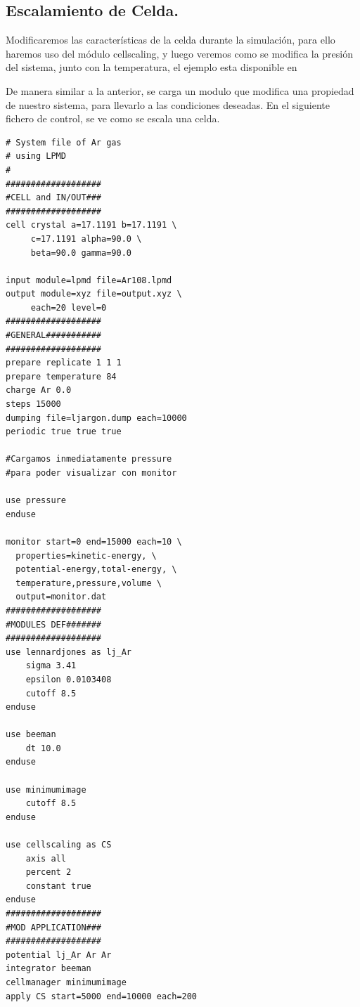 \subsection{Escalamiento de Celda.}

Modificaremos las caracter\'isticas de la celda durante la simulaci\'on, para ello haremos uso del m\'odulo cellscaling, y luego veremos como se modifica la presi\'on del sistema, junto con la temperatura, el ejemplo esta disponible en


De manera similar a la anterior, se carga un modulo que modifica una propiedad de nuestro sistema, para llevarlo a las condiciones deseadas. En el siguiente fichero de control, se ve como se escala una celda.

\begin{multicols}{2}
\setlength{\columnseprule}{.5pt}
\begin{verbatim}
# System file of Ar gas 
# using LPMD
#
###################
#CELL and IN/OUT###
###################
cell crystal a=17.1191 b=17.1191 \
     c=17.1191 alpha=90.0 \
     beta=90.0 gamma=90.0

input module=lpmd file=Ar108.lpmd
output module=xyz file=output.xyz \
     each=20 level=0
###################
#GENERAL###########
###################
prepare replicate 1 1 1
prepare temperature 84
charge Ar 0.0
steps 15000
dumping file=ljargon.dump each=10000
periodic true true true

#Cargamos inmediatamente pressure
#para poder visualizar con monitor

use pressure
enduse

monitor start=0 end=15000 each=10 \
  properties=kinetic-energy, \
  potential-energy,total-energy, \
  temperature,pressure,volume \
  output=monitor.dat
###################
#MODULES DEF#######
###################
use lennardjones as lj_Ar
    sigma 3.41
    epsilon 0.0103408
    cutoff 8.5
enduse

use beeman
    dt 10.0
enduse

use minimumimage
    cutoff 8.5
enduse

use cellscaling as CS
    axis all
    percent 2
    constant true
enduse
###################
#MOD APPLICATION###
###################
potential lj_Ar Ar Ar
integrator beeman
cellmanager minimumimage
apply CS start=5000 end=10000 each=200
\end{verbatim}
\end{multicols}

